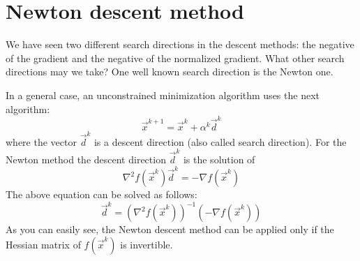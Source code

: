 \section{Newton descent method}
    We have seen two different search directions in the descent methods: the negative of the gradient and the negative of the normalized gradient. What other search directions may we take? One well known search direction is the Newton one.\par
    In a general case, an unconstrained minimization algorithm uses the next algorithm:
    \[\vec{x}^{k+1} = \vec{x}^k + \alpha^k\vec{d}^k\]
    where the vector \(\vec{d}^k\) is a descent direction (also called search direction). For the Newton method the descent direction \(\vec{d}^k\) is the solution of
    \[\nabla^2f(\vec{x}^k)\vec{d}^k = -\nabla f(\vec{x}^k)\]
    The above equation can be solved as follows:
    \[\vec{d}^k = (\nabla^2f(\vec{x}^k))^{-1}(-\nabla f(\vec{x}^k))\]
    As you can easily see, the Newton descent method can be applied only if the Hessian matrix of \(f(\vec{x}^k)\) is invertible.

